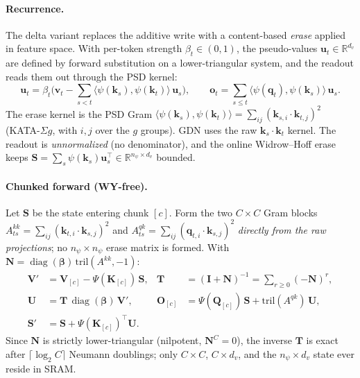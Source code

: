 \documentclass{article}
\newcommand{\1}{\bm{1}}
\newcommand{\diag}{\mathop{\mathrm{diag}}}
\newcommand{\lrangle}[1]{\langle#1\rangle}
\def\vk{{\bm{k}}}
\def\vo{{\bm{o}}}
\def\vq{{\bm{q}}}
\def\vu{{\bm{u}}}
\def\vv{{\bm{v}}}
\def\mI{{\bm{I}}}
\def\mK{{\bm{K}}}
\def\mN{{\bm{N}}}
\def\mO{{\bm{O}}}
\def\mQ{{\bm{Q}}}
\def\mS{{\bm{S}}}
\def\mT{{\bm{T}}}
\def\mU{{\bm{U}}}
\def\mV{{\bm{V}}}
\newcommand{\R}{\mathbb{R}}
\theoremstyle{definition}
\begin{document}
\paragraph{Recurrence.} The delta variant replaces the additive write with a content-based
\emph{erase} applied in feature space. With per-token strength $\beta_t\in(0,1)$, the
pseudo-values $\vu_t\in\R^{d_v}$ are defined by forward substitution on a lower-triangular
system, and the readout reads them out through the PSD kernel:
\begin{equation}
  \vu_t = \beta_t\Big(\vv_t - \!\sum_{s<t}\!\lrangle{\psi(\vk_s),\psi(\vk_t)}\,\vu_s\Big),
  \qquad
  \vo_t = \sum_{s\le t}\lrangle{\psi(\vq_t),\psi(\vk_s)}\,\vu_s .
  \label{eq:delta-rec}
\end{equation}
The erase kernel is the PSD Gram
$\lrangle{\psi(\vk_s),\psi(\vk_t)}=\sum_{ij}(\vk_{s,i}\!\cdot\!\vk_{t,j})^2$
(KATA-$\Sigma g$, with $i,j$ over the $g$ groups). GDN uses the raw
$\vk_s\!\cdot\!\vk_t$ kernel. The readout is \emph{unnormalized} (no denominator), and the
online Widrow--Hoff erase keeps
$\mS=\sum_s\psi(\vk_s)\vu_s^\top\in\R^{n_\psi\times d_v}$ bounded.

\paragraph{Chunked forward (WY-free).} Let $\mS$ be the state entering chunk $[c]$. Form the two
$C\times C$ Gram blocks $A^{kk}_{ts}=\sum_{ij}(\vk_{t,i}\!\cdot\!\vk_{s,j})^2$ and
$A^{qk}_{ts}=\sum_{ij}(\vq_{t,i}\!\cdot\!\vk_{s,j})^2$ \emph{directly from the raw projections}; no $n_\psi\times n_\psi$ erase matrix is formed. With $\mN=\diag(\bm\beta)\,\mathrm{tril}(A^{kk},-1)$:
\begin{align}
  \mV' &= \mV_{[c]} - \Psi(\mK_{[c]})\,\mS,
  &\mT &= (\mI+\mN)^{-1}=\textstyle\sum_{r\ge0}(-\mN)^r,
  \label{eq:delta-T}\\
  \mU &= \mT\,\diag(\bm\beta)\,\mV',
  &\mO_{[c]} &= \Psi(\mQ_{[c]})\,\mS + \mathrm{tril}(A^{qk})\,\mU,
  \label{eq:delta-out}\\
  \mS' &= \mS + \Psi(\mK_{[c]})^\top\mU.
  \label{eq:delta-S}
\end{align}
Since $\mN$ is strictly lower-triangular (nilpotent, $\mN^{C}{=}0$), the inverse $\mT$ is exact
after $\lceil\log_2 C\rceil$ Neumann doublings; only $C\times C$, $C\times d_v$, and the
$n_\psi\times d_v$ state ever reside in SRAM.
\end{document}
